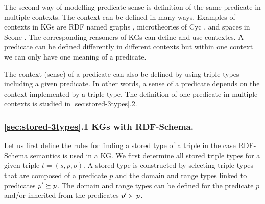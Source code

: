 \documentclass[runningheads]{llncs}
\newcommand{\memo}[1]{}
\newcommand{\notes}[1]{\noindent\begin{small}-- \emph{#1}\hfill\break\end{small}}
\begin{document}
The second way of modelling predicate sense is definition of the same
predicate in multiple contexts. The context can be defined in many
ways. Examples of contexts in KGs are RDF named graphs
\cite{Carroll2005}, microtheories of Cyc \cite{cyc}, and spaces in
Scone \cite{Fahlman2011}. The corresponding reasoners of KGs can
define and use contextes. A predicate can be defined differently in
different contexts but within one context we can only have one meaning
of a predicate.

The context (sense) of a predicate can also be defined by using triple
types including a given predicate. In other words, a sense of a
predicate depends on the context implemented by a triple type. The
definition of one predicate in multiple contexts is studied in
\ref{sec:stored-3types}.2.

\memo{
\notes{Whitin an ontology it seems that the triple type can be used, quite naturally, as the context of a predicate.}
\notes{The meaning of predicate is modelled by a triple type including concrete classes, types of domains and ranges.}
\notes{We have one triple type (predicate and types of S and O) mapped to one meaning.}
\notes{The representation requires using contextual reasoning \cite{cyc}.}
\notes{One of the pros is that contextual representation and reasoning is close to the natural language \cite{Fahlman2011}.}
\notes{Pitfalls of word sense disambiguation and contextual reasoning....}}

\memo{
How to define types of predicates when we have $\land$ and $\lor$-types possibly in different ontologies, RDF graphs, or KGs.
Different situations where and how the domains and ranges of predicate can be defined.
List some possibilities: diff ontologies, diff contexts, explicit definition of union in a context,...
We are goiung to use OWL syntax for the definition of domains and ranges.
For simplicity we assume that for each predicate we have a definition of the domain (range) in disjunctive noraml form.
}

\subsubsection{\ref{sec:stored-3types}.1 KGs with RDF-Schema.}
Let us first define the rules for finding a stored type of a triple in
the case RDF-Schema semantics is used in a KG. We first determine all
stored triple types for a given triple $t=(s,p,o)$. A stored type is
constructed by selecting triple types that are composed of a predicate
$p$ and the domain and range types linked to predicates
$p'\succeq\/p$. The domain and range types can be defined for the
predicate $p$ and/or inherited from the predicates $p'\succ\/p$.
\end{document}

